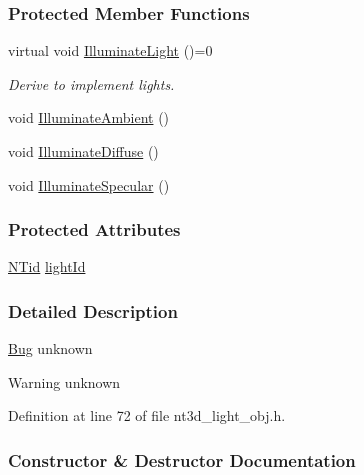 \subsubsection*{Protected Member Functions}
\begin{DoxyCompactItemize}
\item 
virtual void \hyperlink{class_n_t3_d__light__o_acca67ca286bb2f6c5ecdbcaeb935c66d}{IlluminateLight} ()=0
\begin{DoxyCompactList}\small\item\em Derive to implement lights. \item\end{DoxyCompactList}\item 
void \hyperlink{class_n_t3_d__light__o_a7fbc8e7323cf3501ed230eba0400a5c1}{IlluminateAmbient} ()
\item 
void \hyperlink{class_n_t3_d__light__o_a014b4c5f911e8b4361917ffd1f06848b}{IlluminateDiffuse} ()
\item 
void \hyperlink{class_n_t3_d__light__o_a4b5b552b082cd48577c4cf9736595c8d}{IlluminateSpecular} ()
\end{DoxyCompactItemize}
\subsubsection*{Protected Attributes}
\begin{DoxyCompactItemize}
\item 
\hyperlink{nt__types_8h_ab5cab5f78fdd2211c340cbe527a4afd7}{NTid} \hyperlink{class_n_t3_d__light__o_a908cd2700dcf23eb04f66e8c6b5c30e0}{lightId}
\end{DoxyCompactItemize}


\subsubsection{Detailed Description}
\begin{Desc}
\item[\hyperlink{bug__bug000019}{Bug}]unknown \end{Desc}
\begin{DoxyWarning}{Warning}
unknown 
\end{DoxyWarning}


Definition at line 72 of file nt3d\_\-light\_\-obj.h.



\subsubsection{Constructor \& Destructor Documentation}
